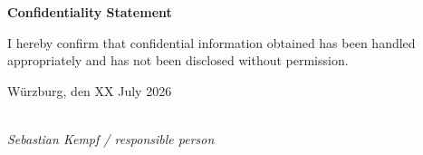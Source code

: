 \thispagestyle{empty}


\vspace*{1cm}

\begin{center}
    \textbf{Confidentiality Statement}
\end{center}

\vspace*{1cm}

\noindent 
I hereby confirm that confidential information obtained has been handled appropriately and has not been disclosed without permission.


\vspace{2cm}

\noindent
Würzburg, den XX July 2026

\vspace{3cm}

\hspace*{7cm}%
\dotfill\\
\hspace*{8.5cm}%
\textit{Sebastian Kempf / responsible person}